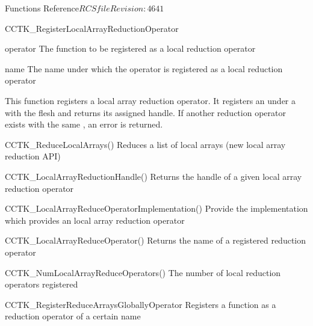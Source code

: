 \begin{cactuspart}{ Functions Reference}{$RCSfile$}{$Revision: 4641 $}
\begin{FunctionDescription}{CCTK\_RegisterLocalArrayReductionOperator}
\begin{ParameterSection}
\begin{Parameter}{operator}
The function to be registered as a local reduction operator
\end{Parameter}
\begin{Parameter}{name}
The name under which the operator is registered as a local reduction operator
\end{Parameter}
\end{ParameterSection}

\begin{Discussion}
This function registers a local array reduction operator. It registers an 
under a  with the flesh and returns its assigned handle. If another reduction
operator exists with the same , an error is returned.
\end{Discussion}

\begin{SeeAlsoSection}
\begin{SeeAlso}{CCTK\_ReduceLocalArrays()}
Reduces a list of local arrays (new local array reduction API)
\end{SeeAlso}

\begin{SeeAlso}{CCTK\_LocalArrayReductionHandle()}
Returns the handle of a given local array reduction operator
\end{SeeAlso}

\begin{SeeAlso}{CCTK\_LocalArrayReduceOperatorImplementation()}
Provide the implementation which provides an local array reduction operator
\end{SeeAlso}

\begin{SeeAlso}{CCTK\_LocalArrayReduceOperator()}
Returns the name of a registered reduction operator
\end{SeeAlso}

\begin{SeeAlso}{CCTK\_NumLocalArrayReduceOperators()}
The number of local reduction operators registered
\end{SeeAlso}
\end{SeeAlsoSection}
\end{FunctionDescription}

\begin{FunctionDescription}{CCTK\_RegisterReduceArraysGloballyOperator}
\label{CCTK-RegisterReduceArraysGloballyOperator}
Registers a function as a reduction operator of a certain name


\end{FunctionDescription}
\end{cactuspart}
